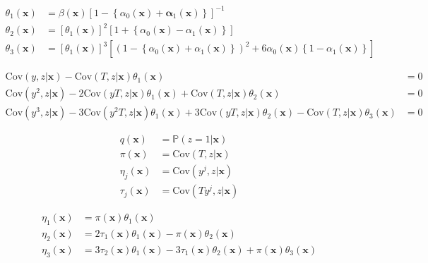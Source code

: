 \documentclass[12pt]{article}
\begin{document}
\begin{align}
  \label{eq:theta1_def}
  \theta_1(\mathbf{x}) &= \beta(\mathbf{x})\left[ 1 - \left\{ \alpha_0(\mathbf{x}) + \mathbf{\alpha}_1(\mathbf{x}) \right\} \right]^{-1}\\
  \label{eq:theta2_def}
  \theta_2(\mathbf{x}) &= \left[\theta_1(\mathbf{x})\right]^2 \left[ 1 + \left\{\alpha_0(\mathbf{x}) - \alpha_1(\mathbf{x})\right\}\right] \\
  \label{eq:theta3_def}
  \theta_3(\mathbf{x}) &= \left[\theta_1(\mathbf{x})\right]^3\left[ \left( 1 - \left\{\alpha_0(\mathbf{x}) + \alpha_1(\mathbf{x})\right\} \right)^2 + 6\alpha_0(\mathbf{x})\left\{ 1 - \alpha_1(\mathbf{x}) \right\} \right]
\end{align}

\begin{align*}
  \mbox{Cov}(y,z|\mathbf{x}) - \mbox{Cov}(T,z|\mathbf{x}) \theta_1(\mathbf{x}) &= 0\\
  \mbox{Cov}(y^2,z|\mathbf{x}) - 2\mbox{Cov}(yT,z|\mathbf{x}) \theta_1(\mathbf{x}) + \mbox{Cov}(T,z|\mathbf{x})\theta_2(\mathbf{x}) &= 0\\
  \mbox{Cov}(y^3,z|\mathbf{x}) - 3 \mbox{Cov}(y^2T,z|\mathbf{x}) \theta_1(\mathbf{x}) + 3\mbox{Cov}(yT,z|\mathbf{x}) \theta_2(\mathbf{x}) - \mbox{Cov}(T,z|\mathbf{x}) \theta_3(\mathbf{x})&= 0
\end{align*}

\begin{align*}
  q(\mathbf{x}) &= \mathbb{P}(z=1|\mathbf{x})\\
  \pi(\mathbf{x}) &= \mbox{Cov}(T,z|\mathbf{x})\\
  \eta_j(\mathbf{x}) &= \mbox{Cov}(y^j,z|\mathbf{x})\\
  \tau_j(\mathbf{x}) &= \mbox{Cov}(Ty^j,z|\mathbf{x})
\end{align*}

\begin{align*}
 \eta_1(\mathbf{x}) &= \pi(\mathbf{x})\theta_1(\mathbf{x}) \\
  \eta_2(\mathbf{x}) &=  2\tau_1(\mathbf{x}) \theta_1(\mathbf{x}) - \pi(\mathbf{x})\theta_2(\mathbf{x}) \\
  \eta_3(\mathbf{x}) &=  3\tau_2(\mathbf{x}) \theta_1(\mathbf{x}) - 3\tau_1(\mathbf{x}) \theta_2(\mathbf{x}) + \pi(\mathbf{x})\theta_3(\mathbf{x})
\end{align*}



\begin{lem}
  
\end{lem}
\end{document}
